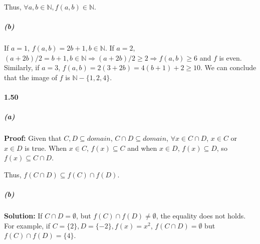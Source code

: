 \documentclass[11pt]{report}
\begin{document}
Thus, $\forall a, b \in \mathbb{N}, f(a,b) \in \mathbb{N}$.

    \subparagraph{(b)} If $a = 1$, $f(a,b) = 2b + 1, b \in \mathbb{N}$. If $a = 2$, $(a+2b)/2 = b+1, b \in \mathbb{N} \Rightarrow (a+2b)/2 \geq 2 \Rightarrow f(a, b) \geq 6$ and $f$ is even. Similarly, if $a = 3$, $f(a, b) = 2(3+2b) = 4(b+1) + 2 \geq 10$. We can conclude that the image of $f$ is $\mathbb{N} - \{1, 2, 4\}$.
\paragraph{1.50}
    \subparagraph{(a)} \textbf{Proof:} Given that $C, D \subseteq domain$, $C \cap D \subseteq domain$, $\forall x \in C \cap D$, $x \in C$ or $x \in D$ is true. When $x \in C$, $f(x) \subseteq C$ and when $x \in D$, $f(x) \subseteq D$, so $f(x) \subseteq C \cap D$.

Thus, $f(C \cap D) \subseteq f(C) \cap f(D)$.


    \subparagraph{(b)} \textbf{Solution: } If $C \cap D = \emptyset$, but $f(C) \cap f(D) \neq \emptyset$, the equality does not holds. For example, if $C = \{2\}, D = \{-2\}, f(x) = x^2$, $f(C \cap D) = \emptyset$ but $f(C) \cap f(D) = \{4\}$.
\end{document}
